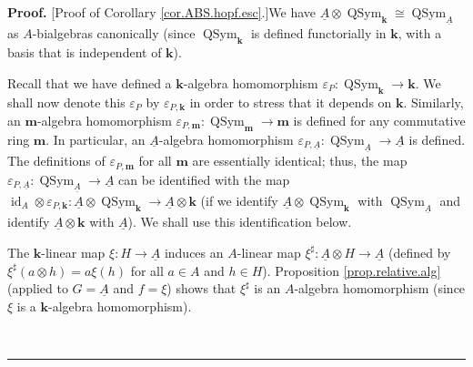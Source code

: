 \documentclass
[numbers=enddot,12pt,final,onecolumn,notitlepage,abstracton]{scrartcl}%
\theoremstyle{definition}
\newenvironment{proof}[1][Proof]{\noindent\textbf{#1.} }{\ \rule{0.5em}{0.5em}}
\begin{document}
\begin{proof}
[Proof of Corollary \ref{cor.ABS.hopf.esc}.]We have $\underline{A}%
\otimes\operatorname*{QSym}\nolimits_{\mathbf{k}}\cong\operatorname*{QSym}%
\nolimits_{\underline{A}}$ as $A$-bialgebras canonically (since
$\operatorname*{QSym}\nolimits_{\mathbf{k}}$ is defined functorially in
$\mathbf{k}$, with a basis that is independent of $\mathbf{k}$).

Recall that we have defined a $\mathbf{k}$-algebra homomorphism $\varepsilon
_{P}:\operatorname*{QSym}\nolimits_{\mathbf{k}}\rightarrow\mathbf{k}$. We
shall now denote this $\varepsilon_{P}$ by $\varepsilon_{P,\mathbf{k}}$ in
order to stress that it depends on $\mathbf{k}$. Similarly, an $\mathbf{m}%
$-algebra homomorphism $\varepsilon_{P,\mathbf{m}}:\operatorname*{QSym}%
\nolimits_{\mathbf{m}}\rightarrow\mathbf{m}$ is defined for any commutative
ring $\mathbf{m}$. In particular, an $\underline{A}$-algebra homomorphism
$\varepsilon_{P,\underline{A}}:\operatorname*{QSym}\nolimits_{\underline{A}%
}\rightarrow\underline{A}$ is defined. The definitions of $\varepsilon
_{P,\mathbf{m}}$ for all $\mathbf{m}$ are essentially identical; thus, the map
$\varepsilon_{P,\underline{A}}:\operatorname*{QSym}\nolimits_{\underline{A}%
}\rightarrow\underline{A}$ can be identified with the map $\operatorname*{id}%
\nolimits_{A}\otimes\varepsilon_{P,\mathbf{k}}:\underline{A}\otimes
\operatorname*{QSym}\nolimits_{\mathbf{k}}\rightarrow\underline{A}%
\otimes\mathbf{k}$ (if we identify $\underline{A}\otimes\operatorname*{QSym}%
\nolimits_{\mathbf{k}}$ with $\operatorname*{QSym}\nolimits_{\underline{A}}$
and identify $\underline{A}\otimes\mathbf{k}$ with $\underline{A}$). We shall
use this identification below.

The $\mathbf{k}$-linear map $\xi:H\rightarrow\underline{A}$ induces an
$A$-linear map $\xi^{\sharp}:\underline{A}\otimes H\rightarrow\underline{A}$
(defined by $\xi^{\sharp}\left(  a\otimes h\right)  =a\xi\left(  h\right)  $
for all $a\in A$ and $h\in H$). Proposition \ref{prop.relative.alg} (applied
to $G=\underline{A}$ and $f=\xi$) shows that $\xi^{\sharp}$ is an $A$-algebra
homomorphism (since $\xi$ is a $\mathbf{k}$-algebra homomorphism).


\end{proof}
\end{document}
